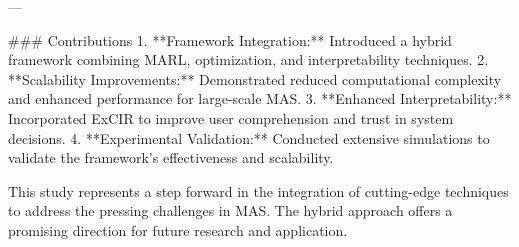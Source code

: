 ---

### Contributions  
1. **Framework Integration:** Introduced a hybrid framework combining MARL, optimization, and interpretability techniques.
2. **Scalability Improvements:** Demonstrated reduced computational complexity and enhanced performance for large-scale MAS.
3. **Enhanced Interpretability:** Incorporated ExCIR to improve user comprehension and trust in system decisions.
4. **Experimental Validation:** Conducted extensive simulations to validate the framework's effectiveness and scalability.

This study represents a step forward in the integration of cutting-edge techniques to address the pressing challenges in MAS. The hybrid approach offers a promising direction for future research and application.